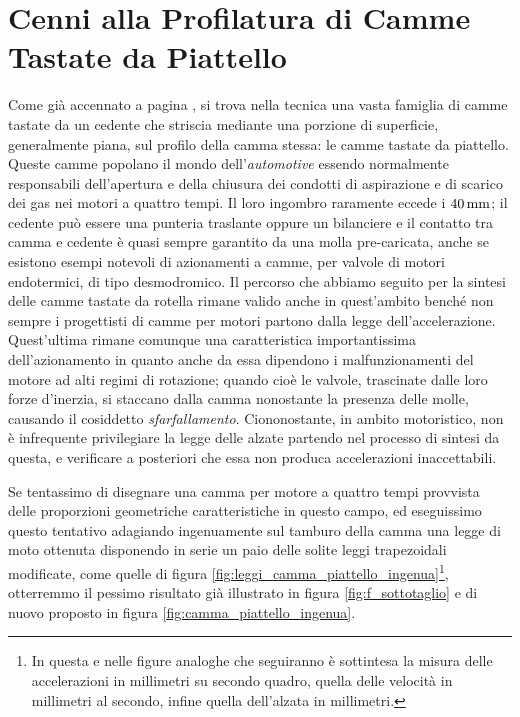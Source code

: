 \section{Cenni alla Profilatura di Camme Tastate da Piattello}

\noindent Come gi\`a accennato a pagina \pageref{fig:f_campiat}, si trova
nella tecnica una vasta famiglia di camme tastate da un cedente
che striscia mediante una porzione di superficie, generalmente
piana, sul profilo della camma
stessa: le camme tastate da piattello. Queste camme popolano il mondo
dell'{\em automotive} essendo normalmente responsabili dell'apertura e della
chiusura dei condotti di aspirazione e di scarico dei gas nei motori a quattro
tempi. Il loro ingombro raramente eccede i $40\, {\rm mm}$; il cedente
 pu\`o essere
una punteria traslante oppure un bilanciere e il contatto tra camma e cedente
\`e quasi sempre garantito da una molla pre-caricata, anche se esistono esempi
notevoli di azionamenti a camme, per valvole di motori endotermici, di
tipo desmodromico.
Il percorso che abbiamo seguito per la sintesi delle camme tastate da rotella
rimane valido anche in quest'ambito bench\'e non sempre i progettisti di camme
per motori partono dalla legge dell'accelerazione. Quest'ultima rimane comunque
una caratteristica importantissima dell'azionamento in quanto anche da essa dipendono
i malfunzionamenti del motore ad alti regimi di rotazione; quando cio\`e
le valvole, trascinate dalle loro forze d'inerzia, si staccano dalla camma
nonostante la presenza delle molle, causando il cosiddetto {\em sfarfallamento}.
Ciononostante, in ambito motoristico, non \`e infrequente privilegiare
la legge delle alzate partendo nel processo di sintesi da
questa, e verificare a posteriori che essa non produca
accelerazioni inaccettabili.

\noindent Se tentassimo di disegnare una camma per motore a quattro tempi
provvista delle proporzioni geometriche  caratteristiche in questo campo,
ed eseguissimo questo tentativo
adagiando ingenuamente sul tamburo della camma
una legge di moto ottenuta disponendo
in serie un paio delle solite leggi trapezoidali modificate, come quelle di figura
\ref{fig:leggi_camma_piattello_ingenua}\footnote{In
questa e nelle figure analoghe che seguiranno \`e sottintesa la misura delle
accelerazioni in millimetri su secondo quadro, quella delle velocit\`a
in millimetri al secondo, infine quella dell'alzata
in millimetri.},
otterremmo il pessimo risultato gi\`a illustrato in figura
\ref{fig:f_sottotaglio} e di nuovo proposto in figura
\ref{fig:camma_piattello_ingenua}.


